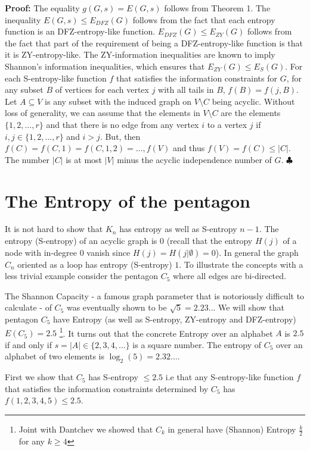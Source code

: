 \documentclass[12pt]{article}
\begin{document}
\noindent
{\bf Proof:} The equality $g(G,s)=E(G,s)$ follows from Theorem 1. The inequality $E(G,s) 
\leq E_{DFZ}(G)$ follows from the fact that each entropy function is an DFZ-entropy-like function.
$E_{DFZ}(G) \leq E_{ZY}(G)$ follows from the fact that part of the requirement of being a DFZ-entropy-like function is that it is ZY-entropy-like.  The ZY-information inequalities
are known to imply Shannon's information inequalities, which ensures that $E_{ZY}(G) \leq E_S(G)$.
For each S-entropy-like function $f$ that satisfies the information constraints for $G$, for any subset $B$ of vertices  for each vertex $j$ with all tails in $B$,  $f(B)=f(j, B)$. Let $A \subseteq V$ is any subset with the induced graph on $V \setminus C$ being acyclic. Without loss of generality, we can assume that
the elements in $V \setminus C$ are the elements $\{1,2,\ldots,r\}$ and that there is no edge from
any vertex $i$ to a vertex $j$ if $i,j \in \{1,2, \ldots,r\}$ and $i>j$. But, then $f(C)=f(C,1)=f(C,1,2)= 
\ldots, f(V)$ and thus $f(V)=f(C) \leq |C|$. The number $|C|$ is at most $|V|$ minus the acyclic
independence number of $G$.
\hfill $\clubsuit$

 
\section{The Entropy of the pentagon}

It is not hard to show that $K_n$ has entropy as well as S-entropy $n-1$. The entropy (S-entropy) of an acyclic graph is $0$ (recall that the entropy $H(j)$ of a node with in-degree $0$ vanish since $H(j)=H(j | \emptyset) =0$). In general the graph $C_n$ oriented as a loop has entropy (S-entropy) $1$.
To illustrate the concepts with a less trivial example consider the pentagon $C_5$ where all edges are 
bi-directed.

The Shannon Capacity - a famous graph parameter that is notoriously difficult to calculate - of $C_5$  was eventually shown to be $\sqrt{5}=2.23..$.    We will show that pentagon $C_5$ have Entropy (as well as S-entropy, ZY-entropy  and DFZ-entropy)  $E(C_5)=2.5$ \footnote{Joint with Dantchev we showed that $C_{k}$ in general have (Shannon) Entropy  $\frac{k}{2}$ for any $k \geq 4$ }.  It turns out that the concrete Entropy over an alphabet $A$ is $2.5$ if and only if $s=|A| \in \{2,3,4,\ldots\}$ is a square number. The entropy of $C_5$ over an alphabet of two elements is  $\log_2(5)=2.32...$.

 First we show that
$C_5$ has S-entropy $\leq 2.5$ i.e that any S-entropy-like function $f$ that satisfies the information constraints determined by $C_5$ has $f(1,2,3,4,5) \leq 2.5$.
\end{document}
